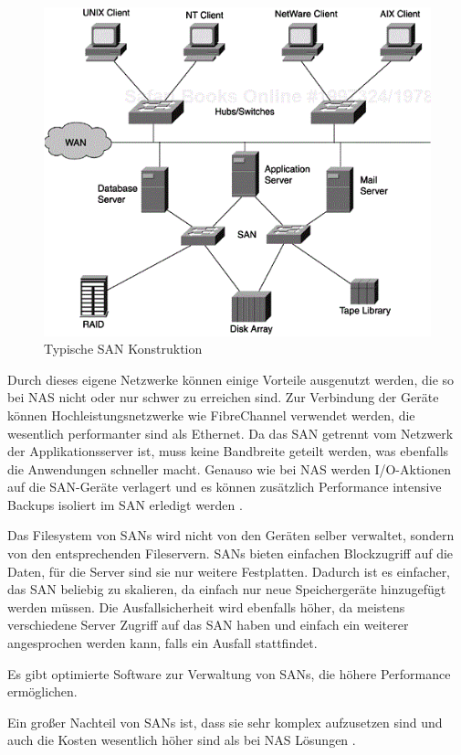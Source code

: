 \begin{figure}[hbt]
	\centering
	\includegraphics[scale=0.9]{images/storage-area-network}
	\caption{Typische SAN Konstruktion \parencite[Kap. 1]{gupta.2002}}
	\label{fig:storageareanetwork}
\end{figure}

Durch dieses eigene Netzwerke können einige Vorteile ausgenutzt werden, die so bei \ac{NAS} nicht oder nur schwer zu erreichen sind. Zur Verbindung der Geräte können Hochleistungsnetzwerke wie FibreChannel verwendet werden, die wesentlich performanter sind als Ethernet. Da das SAN getrennt vom Netzwerk der Applikationsserver ist, muss keine Bandbreite geteilt werden, was ebenfalls die Anwendungen schneller macht. Genauso wie bei NAS werden I/O-Aktionen auf die SAN-Geräte verlagert und es können zusätzlich Performance intensive Backups isoliert im SAN erledigt werden \parencite[Kap. 1, SANs]{gupta.2002}.

Das Filesystem von SANs wird nicht von den Geräten selber verwaltet, sondern von den entsprechenden Fileservern. SANs bieten einfachen Blockzugriff auf die Daten, für die Server sind sie nur weitere Festplatten. Dadurch ist es einfacher, das SAN beliebig zu skalieren, da einfach nur neue Speichergeräte hinzugefügt werden müssen. Die Ausfallsicherheit wird ebenfalls höher, da meistens verschiedene Server Zugriff auf das SAN haben und einfach ein weiterer angesprochen werden kann, falls ein Ausfall stattfindet.

Es gibt optimierte Software zur Verwaltung von SANs, die höhere Performance ermöglichen.

Ein großer Nachteil von SANs ist, dass sie sehr komplex aufzusetzen sind und auch die Kosten wesentlich höher sind als bei NAS Lösungen \parencite[Kap. 2]{gupta.2002}.
